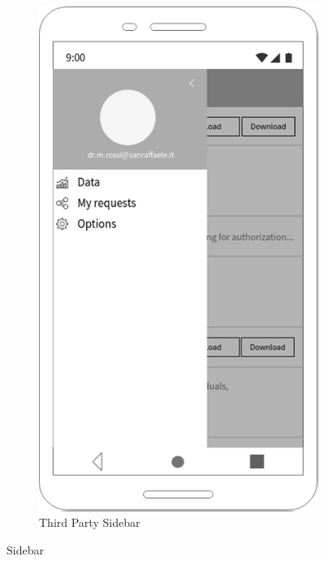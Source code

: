 \begin{figure}[h!]
\begin{subfigure}[b]{0.4\linewidth}
    \includegraphics[width=\linewidth]{img/mockup/tp_sidebar.jpg}
    \caption{Third Party Sidebar}
  \end{subfigure}
\caption{Sidebar}
 \end{figure}

